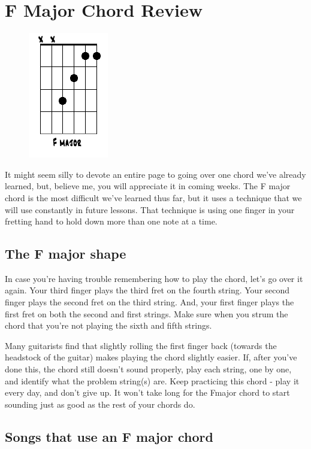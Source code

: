 \section{F Major Chord Review}
\begin{figure}
\includegraphics{partfour/chord_fmajor_open.png}
\end{figure}

It might seem silly to devote an entire page to going over one chord we've
already learned, but, believe me, you will appreciate it in coming weeks. The F
major chord is the most difficult we've learned thus far, but it uses a
technique that we will use constantly in future lessons. That technique is
using one finger in your fretting hand to hold down more than one note at a
time.

\subsection{The F major shape}

In case you're having trouble remembering how to play the chord, let's go over
it again. Your third finger plays the third fret on the fourth string. Your
second finger plays the second fret on the third string. And, your first finger
plays the first fret on both the second and first strings. Make sure when you
strum the chord that you're not playing the sixth and fifth strings.

Many guitarists find that slightly rolling the first finger back (towards the
headstock of the guitar) makes playing the chord slightly easier. If, after
you've done this, the chord still doesn't sound properly, play each string, one
by one, and identify what the problem string(s) are. Keep practicing this chord
- play it every day, and don't give up. It won't take long for the Fmajor chord
to start sounding just as good as the rest of your chords do.

\subsection{Songs that use an F major chord}

